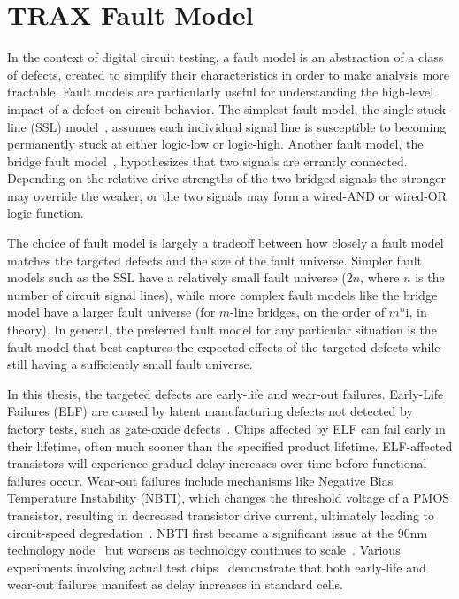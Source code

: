 \chapter{TRAX Fault Model}
\label{chap:trax}

In the context of digital circuit testing, a fault model is an abstraction of a class of defects, created to simplify their characteristics in order to make analysis more tractable.
%
Fault models are particularly useful for understanding the high-level impact of a defect on circuit behavior.
%
The simplest fault model, the single stuck-line (SSL) model~\cite{abramovici90}, assumes each individual signal line is susceptible to becoming permanently stuck at either logic-low or logic-high.
%
Another fault model, the bridge fault model~\cite{abramovici90}, hypothesizes that two signals are errantly connected.
%
Depending on the relative drive strengths of the two bridged signals the stronger may override the weaker, or the two signals may form a wired-AND or wired-OR logic function.

The choice of fault model is largely a tradeoff between how closely a fault model matches the targeted defects and the size of the fault universe.
%
Simpler fault models such as the SSL have a relatively small fault universe ($2 n$, where $n$ is the number of circuit signal lines), while more complex fault models like the bridge model have a larger fault universe (for $m$-line bridges, on the order of $m^n$i, in theory).
%
In general, the preferred fault model for any particular situation is the fault model that best captures the expected effects of the targeted defects while still having a sufficiently small fault universe.

In this thesis, the targeted defects are early-life and wear-out failures.
%
Early-Life Failures (ELF) are caused by latent manufacturing defects not detected by factory tests, such as gate-oxide defects~\cite{chen08}.
%
Chips affected by ELF can fail early in their lifetime, often much sooner than the specified product lifetime.
%
ELF-affected transistors will experience gradual delay increases over time before functional failures occur.
%
Wear-out failures include mechanisms like Negative Bias Temperature Instability (NBTI), which changes the threshold voltage of a PMOS transistor, resulting in decreased transistor drive current, ultimately leading to circuit-speed degredation~\cite{borkar06,schroder03}.
%
NBTI first became a significant issue at the 90nm technology node~\cite{agarwal07} but worsens as technology continues to scale~\cite{reddy02}.
%
Various experiments involving actual test chips~\cite{agarwal07,chen09} demonstrate that both early-life and wear-out failures manifest as delay increases in standard cells.

